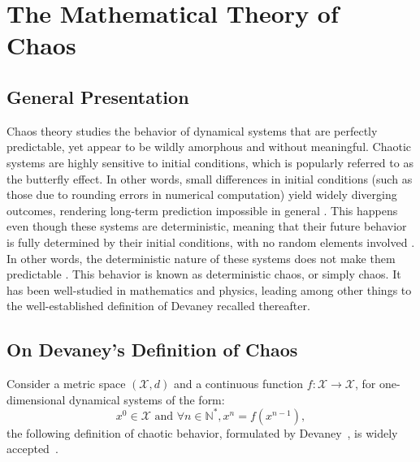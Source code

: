 \section{The Mathematical Theory of Chaos}

\subsection{General Presentation}

Chaos theory studies the behavior of dynamical systems that are perfectly predictable, yet appear to be wildly amorphous and without meaningful. 
Chaotic systems are highly sensitive to initial conditions, 
which is popularly referred to as the butterfly effect. 
In other words, small differences in initial conditions (such as those due to rounding errors in numerical computation) yield widely diverging outcomes, 
rendering long-term prediction impossible in general \cite{kellert1994wake}. This happens even though these systems are deterministic, meaning that their future behavior is fully determined by their initial conditions, with no random elements involved \cite{kellert1994wake}. In other words, the deterministic nature of these systems does not make them predictable \cite{kellert1994wake,Werndl01032009}. This behavior is known as deterministic chaos, or simply chaos. It has been well-studied in mathematics and
physics, leading among other things to the well-established definition of Devaney
recalled thereafter.





\subsection{On Devaney's Definition of Chaos}

Consider a metric space $(\mathcal{X},d)$ and a continuous function $f:\mathcal{X}\longrightarrow \mathcal{X}$, for one-dimensional dynamical systems of the form:
\begin{equation}
x^0 \in \mathcal{X} \textrm{  and } \forall n \in \mathds{N}^*, x^n=f(x^{n-1}),
\label{Devaney}
\end{equation}
the following definition of chaotic behavior, formulated by Devaney~\cite{Dev89}, is widely accepted~\cite{bibtexwangqianxue}.

